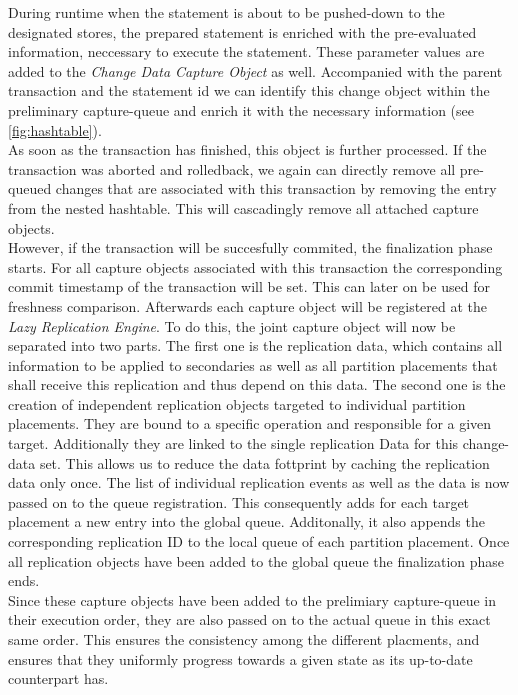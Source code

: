 During runtime when the statement is about to be pushed-down to the designated stores, the prepared statement is enriched with the pre-evaluated information, 
neccessary to execute the statement. These parameter values are added to the \emph{Change Data Capture Object} as well. 
Accompanied with the parent transaction and the statement id we can identify this change object within the preliminary capture-queue 
and enrich it with the necessary information (see \ref{fig:hashtable}).\\
As soon as the transaction has finished, this object is further processed. If the transaction was aborted and rolledback, we again can directly remove all pre-queued changes 
that are associated with this transaction by removing the entry from the nested hashtable. This will cascadingly remove all attached capture objects.\\
However, if the transaction will be succesfully commited, the finalization phase starts. For all capture objects associated with this transaction the corresponding commit 
timestamp of the transaction will be set. This can later on be used for freshness comparison. Afterwards each capture object will be registered at the \emph{Lazy Replication Engine}. 
To do this, the joint capture object will now be separated into two parts. The first one is the replication data, which contains all information to be applied to 
secondaries as well as all partition placements that shall receive this replication and thus depend on this data. The second one is the creation of independent replication 
objects targeted to individual partition placements. They are bound to a specific operation and responsible for a given target. Additionally they are linked to the single replication Data for this change-data set.
This allows us to reduce the data fottprint by caching the replication data only once. The list of individual replication events as well as the data is now passed on to the
queue registration. This consequently adds for each target placement a new entry into the global queue. Additonally, it also appends the corresponding replication ID to 
the local queue of each partition placement. Once all replication objects have been added to the global queue the finalization phase ends.\\
Since these capture objects have been added to the prelimiary capture-queue in their execution order, they are also passed on to the actual queue in this exact same order.
This ensures the consistency among the different placments, and ensures that they uniformly progress towards a given state as its up-to-date counterpart has.\\


